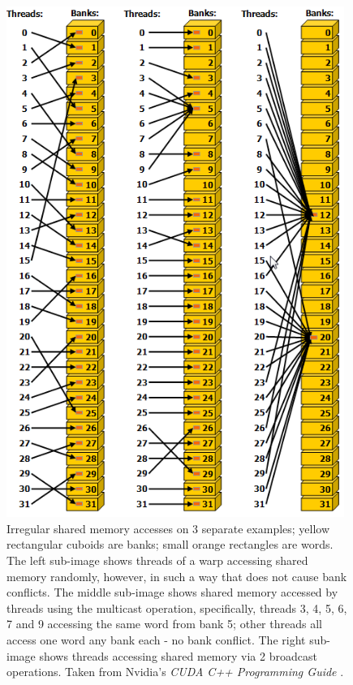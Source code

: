 \begin{figure}[h!]
	\centering
	\includegraphics[width=11cm, keepaspectratio]{images/ch1/CUDA_shared_memory_banks_words_no_conflicts.png}
	\caption{Irregular shared memory accesses on 3 separate examples; yellow rectangular cuboids are banks; small orange rectangles are words. The left sub-image shows threads of a warp accessing shared memory randomly, however, in such a way that does not cause bank conflicts. The middle sub-image shows shared memory accessed by threads using the multicast operation, specifically, threads 3, 4, 5, 6, 7 and 9 accessing the same word from bank 5; other threads all access one word any bank each - no bank conflict. The right sub-image shows threads accessing shared memory via 2 broadcast operations. Taken from Nvidia's \emph{CUDA C++ Programming Guide} \cite{NVIDIAMay2022}.}
	\label{Figure:CUDA-shared-memory-banks-words-no-conflicts}
\end{figure}

